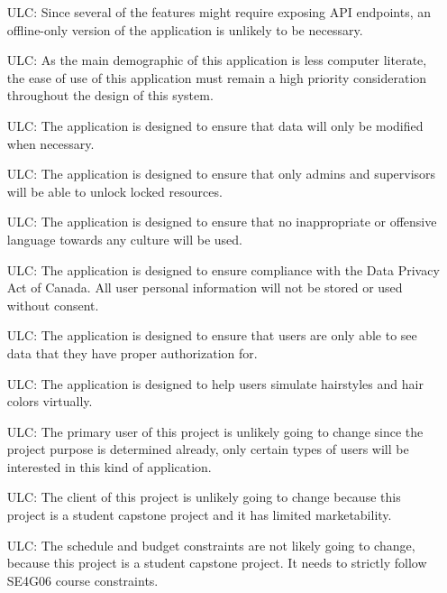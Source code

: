\documentclass[12pt]{article}
\newcounter{lcnum} %
\newcounter{ulcnum} %
\begin{document}
\noindent \begin{itemize}

\item[ULC\refstepcounter{ulcnum}\theulcnum\label{ULC_meaningfulLabel}:] 
Since several of the features might require exposing API endpoints, an offline-only version of the application is unlikely to be necessary. 
\item[ULC\refstepcounter{ulcnum}\theulcnum\label{ULC_meaningfulLabel}:] 
As the main demographic of this application is less computer literate, the ease of use of this application must remain a high priority consideration throughout the design of this system.
\item[ULC\refstepcounter{ulcnum}\theulcnum\label{ULC_meaningfulLabel}:] 
The application is designed to ensure that data will only be modified when necessary. 
\item[ULC\refstepcounter{ulcnum}\theulcnum\label{ULC_meaningfulLabel}:] 
The application is designed to ensure that only admins and supervisors will be able to unlock locked resources.
\item[ULC\refstepcounter{ulcnum}\theulcnum\label{ULC_meaningfulLabel}:] 
The application is designed to ensure that no inappropriate or offensive language towards any culture will be used.
\item[ULC\refstepcounter{ulcnum}\theulcnum\label{ULC_meaningfulLabel}:] 
The application is designed to ensure compliance with the Data Privacy Act of Canada. All user personal information will not be stored or used without consent. 
\item[ULC\refstepcounter{ulcnum}\theulcnum\label{ULC_meaningfulLabel}:] 
The application is designed to ensure that users are only able to see data that they have proper authorization for.
\item[ULC\refstepcounter{ulcnum}\theulcnum\label{ULC_meaningfulLabel}:] 
The application is designed to help users simulate hairstyles and hair colors virtually.
\item[ULC\refstepcounter{ulcnum}\theulcnum\label{ULC_meaningfulLabel}:] 
The primary user of this project is unlikely going to change since the project purpose is determined already, only certain types of users will be interested in this kind of application.
\item[ULC\refstepcounter{ulcnum}\theulcnum\label{ULC_meaningfulLabel}:] 
The client of this project is unlikely going to change because this project is a student capstone project and it has limited marketability.
\item[ULC\refstepcounter{ulcnum}\theulcnum\label{ULC_meaningfulLabel}:] 
The schedule and budget constraints are not likely going to change, because this project is a student capstone project. It needs to strictly follow SE4G06 course constraints.








\end{itemize}
\end{document}
